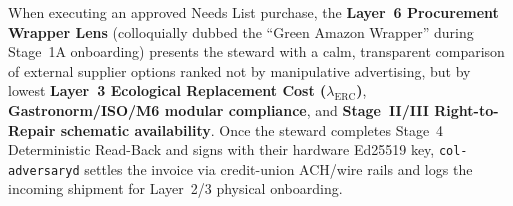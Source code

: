 When executing an approved Needs List purchase, the \textbf{Layer~6 Procurement Wrapper Lens} (colloquially dubbed the ``Green Amazon Wrapper'' during Stage~1A onboarding) presents the steward with a calm, transparent comparison of external supplier options ranked not by manipulative advertising, but by lowest \textbf{Layer~3 Ecological Replacement Cost ($\lambda_{\mathrm{ERC}}$)}, \textbf{Gastronorm/ISO/M6 modular compliance}, and \textbf{Stage~II/III Right-to-Repair schematic availability}. Once the steward completes Stage~4 Deterministic Read-Back and signs with their hardware Ed25519 key, \texttt{col-adversaryd} settles the invoice via credit-union ACH/wire rails and logs the incoming shipment for Layer~2/3 physical onboarding.
